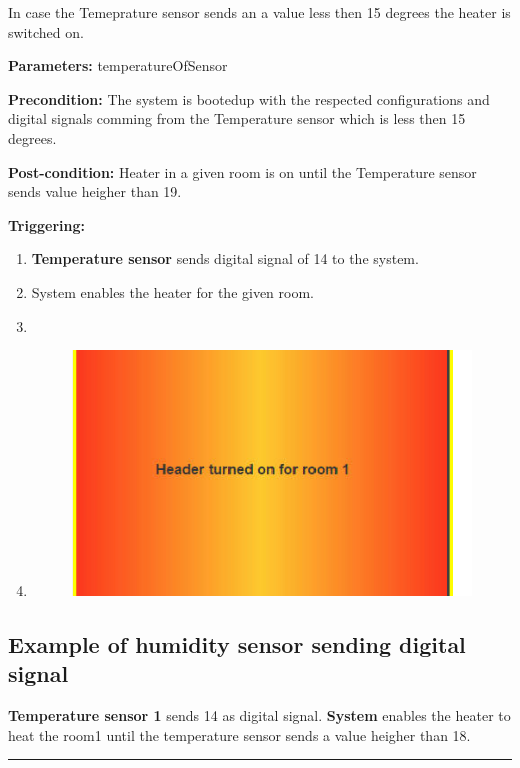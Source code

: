 In case the Temeprature sensor sends an a value less then 15 degrees the heater
is switched on.
\begin{description}
\item \textbf{Parameters:} temperatureOfSensor
\item \textbf{Precondition:} The system is bootedup with the respected
configurations and digital signals comming from the Temperature sensor which is
less then 15 degrees.
\item \textbf{Post-condition:} Heater in a given room is on until the
Temperature sensor sends value heigher than 19.

\item \textbf{Triggering:}
\begin{enumerate}
\item \textbf{Temperature sensor} sends digital signal of 14 to the system.
\item System enables the heater for the given room.
\item \item \begin{figure}[H]
\includegraphics[width=1\textwidth]{images/TurnOnHeater.eps}
\end{figure}
\end{enumerate}
\end{description}

\subsection{Example of humidity sensor sending digital signal}
\textbf{Temperature sensor 1} sends 14 as digital signal. \textbf{System}
enables the heater to heat the room1 until the temperature sensor sends a value
heigher than 18.
\hfill
\vspace{0.5cm}
\hrule


